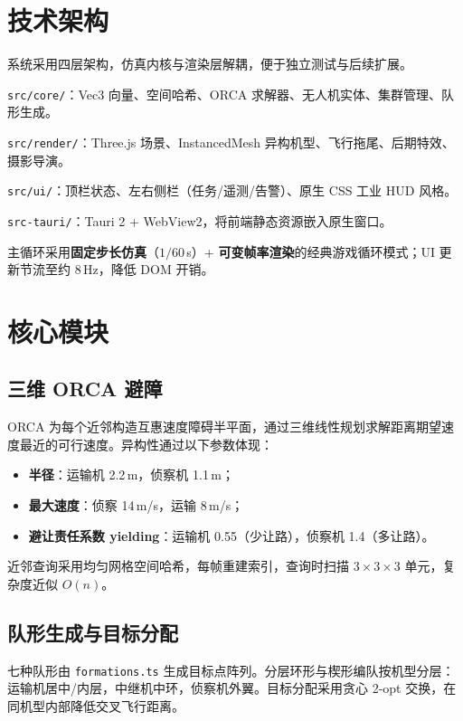 \documentclass[UTF8,a4paper,11pt]{ctexart}
\begin{document}
\section{技术架构}

系统采用四层架构，仿真内核与渲染层解耦，便于独立测试与后续扩展。

\begin{description}[leftmargin=3em,style=nextline]
  \item[仿真内核] \texttt{src/core/}：Vec3 向量、空间哈希、ORCA 求解器、无人机实体、集群管理、队形生成。
  \item[渲染层] \texttt{src/render/}：Three.js 场景、InstancedMesh 异构机型、飞行拖尾、后期特效、摄影导演。
  \item[控制台] \texttt{src/ui/}：顶栏状态、左右侧栏（任务/遥测/告警）、原生 CSS 工业 HUD 风格。
  \item[桌面壳] \texttt{src-tauri/}：Tauri 2 + WebView2，将前端静态资源嵌入原生窗口。
\end{description}

主循环采用\textbf{固定步长仿真}（$1/60$\,s）+ \textbf{可变帧率渲染}的经典游戏循环模式；UI 更新节流至约 8\,Hz，降低 DOM 开销。

\section{核心模块}

\subsection{三维 ORCA 避障}
ORCA 为每个近邻构造互惠速度障碍半平面，通过三维线性规划求解距离期望速度最近的可行速度。异构性通过以下参数体现：
\begin{itemize}[leftmargin=2em]
  \item \textbf{半径}：运输机 2.2\,m，侦察机 1.1\,m；
  \item \textbf{最大速度}：侦察 14\,m/s，运输 8\,m/s；
  \item \textbf{避让责任系数 yielding}：运输机 0.55（少让路），侦察机 1.4（多让路）。
\end{itemize}

近邻查询采用均匀网格空间哈希，每帧重建索引，查询时扫描 $3\times3\times3$ 单元，复杂度近似 $O(n)$。

\subsection{队形生成与目标分配}
七种队形由 \texttt{formations.ts} 生成目标点阵列。分层环形与楔形编队按机型分层：运输机居中/内层，中继机中环，侦察机外翼。目标分配采用贪心 2-opt 交换，在同机型内部降低交叉飞行距离。
\end{document}
